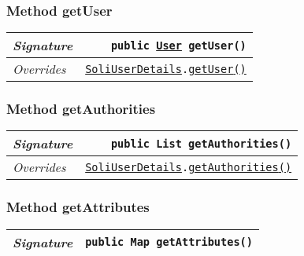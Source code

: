 \begin{adjustwidth}{1.5em}{0pt}
\begin{adjustwidth}{1.5em}{0pt}
\begin{adjustwidth}{1.5em}{0pt}
{\begin{tabularx}{1.0\linewidth}{@{}l R@{}}
      \end{tabularx}}
    \end{adjustwidth}\subsubsection{Method getUser\label{edu.kit.hci.soli.config.security.SoliOidcUserDetails@getUser()}}
    \begin{adjustwidth}{1.5em}{0pt}
      {\begin{tabularx}{1.0\linewidth}{@{}l R@{}}
        \emph{Signature} & \texttt{public \texttt{\hyperref[edu.kit.hci.soli.domain.User]{\texttt{User}}} getUser()} \\
        \hline
        \emph{Overrides} & \texttt{\texttt{\hyperref[edu.kit.hci.soli.config.security.SoliUserDetails]{\texttt{SoliUserDetails}}}.\hyperref[edu.kit.hci.soli.config.security.SoliUserDetails@getUser()]{getUser}\hyperref[edu.kit.hci.soli.config.security.SoliUserDetails@getUser()]{(}\hyperref[edu.kit.hci.soli.config.security.SoliUserDetails@getUser()]{)}} \\
        \hline
  
      \end{tabularx}}
    \end{adjustwidth}\subsubsection{Method getAuthorities\label{edu.kit.hci.soli.config.security.SoliOidcUserDetails@getAuthorities()}}
    \begin{adjustwidth}{1.5em}{0pt}
      {\begin{tabularx}{1.0\linewidth}{@{}l R@{}}
        \emph{Signature} & \texttt{public \texttt{List} getAuthorities()} \\
        \hline
        \emph{Overrides} & \texttt{\texttt{\hyperref[edu.kit.hci.soli.config.security.SoliUserDetails]{\texttt{SoliUserDetails}}}.\hyperref[edu.kit.hci.soli.config.security.SoliUserDetails@getAuthorities()]{getAuthorities}\hyperref[edu.kit.hci.soli.config.security.SoliUserDetails@getAuthorities()]{(}\hyperref[edu.kit.hci.soli.config.security.SoliUserDetails@getAuthorities()]{)}} \\
        \hline
  
      \end{tabularx}}
    \end{adjustwidth}\subsubsection{Method getAttributes\label{edu.kit.hci.soli.config.security.SoliOidcUserDetails@getAttributes()}}
    \begin{adjustwidth}{1.5em}{0pt}
      {\begin{tabularx}{1.0\linewidth}{@{}l R@{}}
        \emph{Signature} & \texttt{public \texttt{Map} getAttributes()} \\
        \hline
  

\end{tabularx}}
\end{adjustwidth}
\end{adjustwidth}
\end{adjustwidth}
